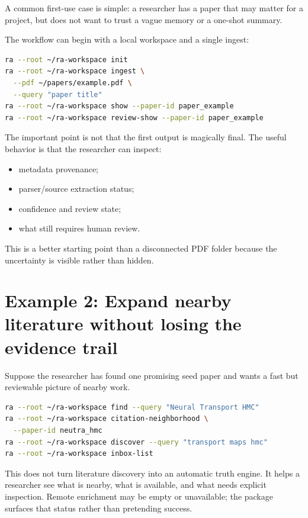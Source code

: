 \documentclass[11pt,a4paper,openany]{book}
\begin{document}
A common first-use case is simple: a researcher has a paper that may matter for a
project, but does not want to trust a vague memory or a one-shot summary.

The workflow can begin with a local workspace and a single ingest:

\begin{lstlisting}[language=bash]
ra --root ~/ra-workspace init
ra --root ~/ra-workspace ingest \
  --pdf ~/papers/example.pdf \
  --query "paper title"
ra --root ~/ra-workspace show --paper-id paper_example
ra --root ~/ra-workspace review-show --paper-id paper_example
\end{lstlisting}

The important point is not that the first output is magically final. The useful
behavior is that the researcher can inspect:
\begin{itemize}[nosep]
  \item metadata provenance;
  \item parser/source extraction status;
  \item confidence and review state;
  \item what still requires human review.
\end{itemize}

This is a better starting point than a disconnected PDF folder because the
uncertainty is visible rather than hidden.

\section{Example 2: Expand nearby literature without losing the evidence trail}

Suppose the researcher has found one promising seed paper and wants a fast but
reviewable picture of nearby work.

\begin{lstlisting}[language=bash]
ra --root ~/ra-workspace find --query "Neural Transport HMC"
ra --root ~/ra-workspace citation-neighborhood \
  --paper-id neutra_hmc
ra --root ~/ra-workspace discover --query "transport maps hmc"
ra --root ~/ra-workspace inbox-list
\end{lstlisting}

This does not turn literature discovery into an automatic truth engine. It helps
a researcher see what is nearby, what is available, and what needs explicit
inspection. Remote enrichment may be empty or unavailable; the package surfaces
that status rather than pretending success.
\end{document}

